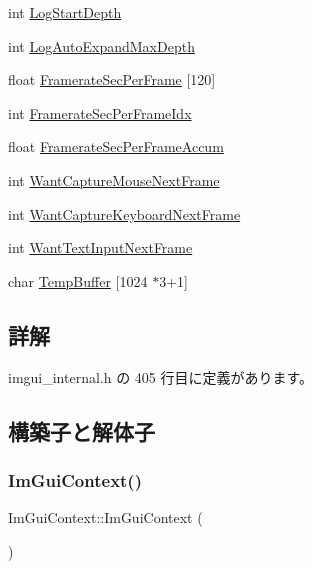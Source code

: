 \begin{DoxyCompactItemize}
\item 
int \mbox{\hyperlink{struct_im_gui_context_a6ac157821b3a0eb9d0411bc477df8665}{Log\+Start\+Depth}}
\item 
int \mbox{\hyperlink{struct_im_gui_context_a153d8c6eee2acdd3676ca55aec7b1079}{Log\+Auto\+Expand\+Max\+Depth}}
\item 
float \mbox{\hyperlink{struct_im_gui_context_aca772ab262c0094e8bbe7eae215fc23b}{Framerate\+Sec\+Per\+Frame}} \mbox{[}120\mbox{]}
\item 
int \mbox{\hyperlink{struct_im_gui_context_a64a96ad72dd7009dba134f6214a4936e}{Framerate\+Sec\+Per\+Frame\+Idx}}
\item 
float \mbox{\hyperlink{struct_im_gui_context_abcd18f2f8fedf0f45c3148b3e956e653}{Framerate\+Sec\+Per\+Frame\+Accum}}
\item 
int \mbox{\hyperlink{struct_im_gui_context_a7e7a9bbeaac9519abe29818ce6c2cc3b}{Want\+Capture\+Mouse\+Next\+Frame}}
\item 
int \mbox{\hyperlink{struct_im_gui_context_a0372056c72eac8b3e6de06c404caa5b3}{Want\+Capture\+Keyboard\+Next\+Frame}}
\item 
int \mbox{\hyperlink{struct_im_gui_context_abe551d35ea5c1aa61a4d5c785c8e0d9d}{Want\+Text\+Input\+Next\+Frame}}
\item 
char \mbox{\hyperlink{struct_im_gui_context_a875033fc5c10bc1e050f8701055ae93b}{Temp\+Buffer}} \mbox{[}1024 $\ast$3+1\mbox{]}
\end{DoxyCompactItemize}


\subsection{詳解}


 imgui\+\_\+internal.\+h の 405 行目に定義があります。



\subsection{構築子と解体子}
\mbox{\label{struct_im_gui_context_a28776600467e31fcc353a8aedec727f1}} 
\subsubsection{\texorpdfstring{Im\+Gui\+Context()}{ImGuiContext()}}
{\footnotesize\ttfamily Im\+Gui\+Context\+::\+Im\+Gui\+Context (\begin{DoxyParamCaption}{ }\end{DoxyParamCaption})\hspace{0.3cm}{\ttfamily [inline]}}




